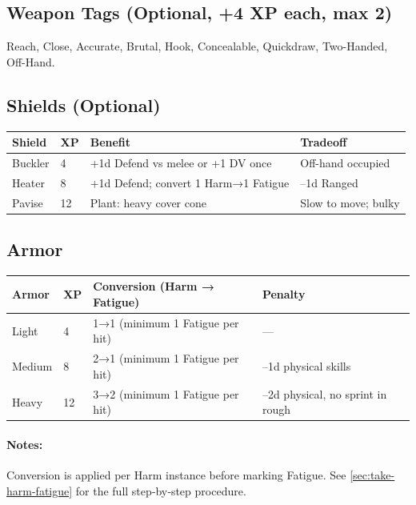 \subsection{Weapon Tags (Optional, +4 XP each, max 2)}
\label{sec:weapon-tags}
Reach, Close, Accurate, Brutal, Hook, Concealable, Quickdraw, Two-Handed, Off-Hand.

\subsection{Shields (Optional)}
\begin{center}
\begin{tabular}{llll}
\toprule
\textbf{Shield} & \textbf{XP} & \textbf{Benefit} & \textbf{Tradeoff} \\
\midrule
Buckler & 4 & +1d Defend vs melee or +1 DV once & Off-hand occupied \\
Heater  & 8 & +1d Defend; convert 1 Harm→1 Fatigue & –1d Ranged \\
Pavise  & 12 & Plant: heavy cover cone & Slow to move; bulky \\
\bottomrule
\end{tabular}
\end{center}

\subsection{Armor}
\label{sec:armor-table}
\begin{center}
\begin{tabular}{llll}
\toprule
\textbf{Armor} & \textbf{XP} & \textbf{Conversion (Harm → Fatigue)} & \textbf{Penalty} \\
\midrule
Light  & 4  & 1→1 (minimum 1 Fatigue per hit) & — \\
Medium & 8  & 2→1 (minimum 1 Fatigue per hit) & –1d physical skills \\
Heavy  & 12 & 3→2 (minimum 1 Fatigue per hit) & –2d physical, no sprint in rough \\
\bottomrule
\end{tabular}
\end{center}

\paragraph{Notes:} Conversion is applied per Harm instance before marking Fatigue. See \ref{sec:take-harm-fatigue} for the full step‑by‑step procedure.

